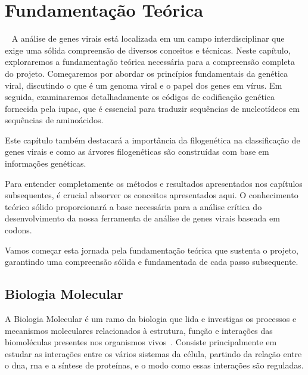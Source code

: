 
\setlength{\parskip}{0.3cm}

\chapter{Fundamentação Teórica}~\label{ch:fundamentacao}
A análise de genes virais está localizada em um campo interdisciplinar que exige uma sólida compreensão de diversos conceitos e técnicas. Neste capítulo, exploraremos a fundamentação teórica necessária para a compreensão completa do projeto. Começaremos por abordar os princípios fundamentais da genética viral, discutindo o que é um genoma viral e o papel dos genes em vírus. Em seguida, examinaremos detalhadamente os códigos de codificação genética fornecida pela \gls{iupac}, que é essencial para traduzir sequências de nucleotídeos em sequências de aminoácidos.

Este capítulo também destacará a importância da filogenética na classificação de genes virais e como as árvores filogenéticas são construídas com base em informações genéticas.

Para entender completamente os métodos e resultados apresentados nos capítulos subsequentes, é crucial absorver os conceitos apresentados aqui. O conhecimento teórico sólido proporcionará a base necessária para a análise crítica do desenvolvimento da nossa ferramenta de análise de genes virais baseada em codons.

Vamos começar esta jornada pela fundamentação teórica que sustenta o projeto, garantindo uma compreensão sólida e fundamentada de cada passo subsequente.

\section{Biologia Molecular}
A Biologia Molecular é um ramo da biologia que lida e investigas os processos e mecanismos moleculares relacionados à estrutura, função e interações das biomoléculas presentes nos organismos vivos~\cite{alberts_biologia_2017}. Consiste principalmente em estudar as interações entre os vários sistemas da célula, partindo da relação entre o \gls{dna}, \gls{rna} e a síntese de proteínas, e o modo como essas interações são reguladas.

